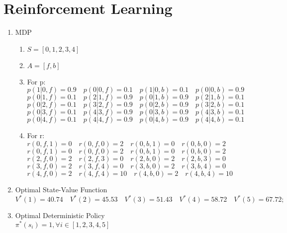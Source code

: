 \documentclass[english]{article}
\begin{document}
\clearpage
\section{Reinforcement Learning}
\begin{enumerate}
    \item MDP
    \begin{enumerate}
    \item $S = [0, 1, 2, 3, 4]$
    \item $A = [f, b]$
    \item For p:\\
    $p(1|0,f) = 0.9 \quad p(0|0,f) = 0.1 \quad p(1|0, b) = 0.1 \quad p(0|0, b) = 0.9$\\
    $p(0|1,f) = 0.1 \quad p(2|1,f) = 0.9 \quad p(0|1, b) = 0.9 \quad p(2|1, b) = 0.1$\\
    $p(0|2,f) = 0.1 \quad p(3|2,f) = 0.9 \quad p(0|2, b) = 0.9 \quad p(3|2, b) = 0.1$\\
    $p(0|3,f) = 0.1 \quad p(4|3,f) = 0.9 \quad p(0|3, b) = 0.9 \quad p(4|3, b) = 0.1$\\
    $p(0|4,f) = 0.1 \quad p(4|4,f) = 0.9 \quad p(0|4, b) = 0.9 \quad p(4|4, b) = 0.1$\\
    \item For r:\\
    $r(0,f,1) = 0 \quad r(0,f,0) = 2 \quad r(0,b,1) = 0 \quad r(0,b,0) = 2$\\
    $r(0,f,1) = 0 \quad r(0,f,0) = 2 \quad r(0,b,1) = 0 \quad r(0,b,0) = 2$\\
    $r(2,f,0) = 2 \quad r(2,f,3) = 0 \quad r(2,b,0) = 2 \quad r(2,b,3) = 0$\\
    $r(3,f,0) = 2 \quad r(3,f,4) = 0 \quad r(3,b,0) = 2 \quad r(3,b,4) = 0$\\
    $r(4,f,0) = 2 \quad r(4, f, 4) = 10 \quad r(4,b,0) = 2 \quad r(4, b, 4) = 10$
    \end{enumerate}
    \item Optimal State-Value Function\\
    $V^*(1) = 40.74\quad  V^*(2) = 45.53\quad  V^*(3) = 51.43\quad  V ^*(4) = 58.72\quad  V^*(5) = 67.72;$
    \item Optimal Deterministic Policy \\
    $\pi^*(s_i) = 1,\forall i \in [1,2,3,4,5]$
\end{enumerate}
\clearpage
\end{document}
